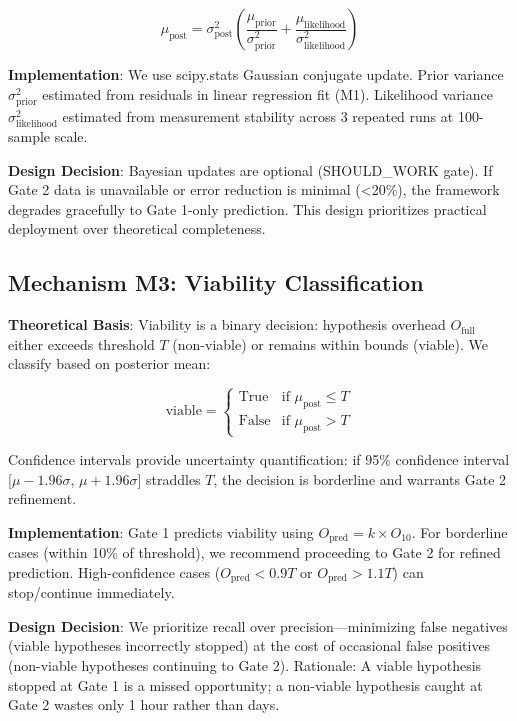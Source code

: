 \begin{equation}
\mu_{\text{post}} = \sigma^2_{\text{post}} \left( \frac{\mu_{\text{prior}}}{\sigma^2_{\text{prior}}} + \frac{\mu_{\text{likelihood}}}{\sigma^2_{\text{likelihood}}} \right)
\end{equation}

\textbf{Implementation}: We use scipy.stats Gaussian conjugate update. Prior variance $\sigma^2_{\text{prior}}$ estimated from residuals in linear regression fit (M1). Likelihood variance $\sigma^2_{\text{likelihood}}$ estimated from measurement stability across 3 repeated runs at 100-sample scale.

\textbf{Design Decision}: Bayesian updates are optional (SHOULD\_WORK gate). If Gate 2 data is unavailable or error reduction is minimal (<20\%), the framework degrades gracefully to Gate 1-only prediction. This design prioritizes practical deployment over theoretical completeness.

\subsection{Mechanism M3: Viability Classification}

\textbf{Theoretical Basis}: Viability is a binary decision: hypothesis overhead $O_{\text{full}}$ either exceeds threshold $T$ (non-viable) or remains within bounds (viable). We classify based on posterior mean:

\begin{equation}
\text{viable} = \begin{cases}
\text{True} & \text{if } \mu_{\text{post}} \leq T \\
\text{False} & \text{if } \mu_{\text{post}} > T
\end{cases}
\end{equation}

Confidence intervals provide uncertainty quantification: if 95\% confidence interval [$\mu - 1.96\sigma$, $\mu + 1.96\sigma$] straddles $T$, the decision is borderline and warrants Gate 2 refinement.

\textbf{Implementation}: Gate 1 predicts viability using $O_{\text{pred}} = k \times O_{10}$. For borderline cases (within 10\% of threshold), we recommend proceeding to Gate 2 for refined prediction. High-confidence cases ($O_{\text{pred}} < 0.9T$ or $O_{\text{pred}} > 1.1T$) can stop/continue immediately.

\textbf{Design Decision}: We prioritize recall over precision---minimizing false negatives (viable hypotheses incorrectly stopped) at the cost of occasional false positives (non-viable hypotheses continuing to Gate 2). Rationale: A viable hypothesis stopped at Gate 1 is a missed opportunity; a non-viable hypothesis caught at Gate 2 wastes only 1 hour rather than days.

